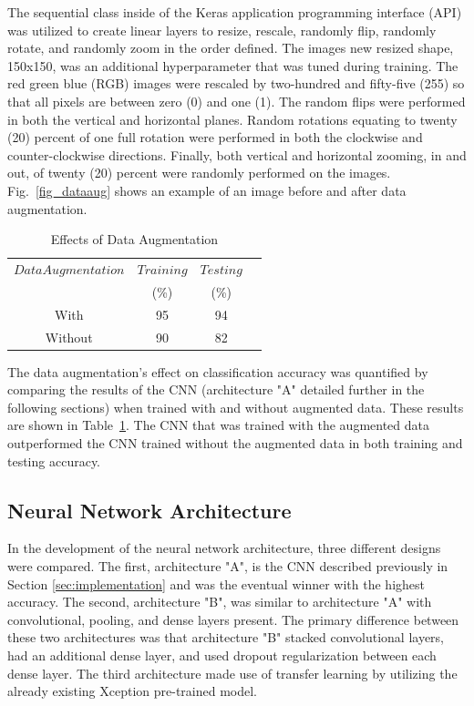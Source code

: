 \documentclass[conference]{IEEEtran}
\begin{document}
The sequential class inside of the Keras application programming interface (API) was utilized to create linear layers to resize, rescale, randomly flip, randomly rotate, and randomly zoom in the order defined. The images new resized shape, 150x150, was an additional hyperparameter that was tuned during training. The red green blue (RGB) images were rescaled by two-hundred and fifty-five (255) so that all pixels are between zero (0) and one (1). The random flips were performed in both the vertical and horizontal planes. Random rotations equating to twenty (20) percent of one full rotation were performed in both the clockwise and counter-clockwise directions. Finally, both vertical and horizontal zooming, in and out, of twenty (20) percent were randomly performed on the images. Fig.~\ref{fig_dataaug} shows an example of an image before and after data augmentation.

\begin{table}[htbp]
\caption{Effects of Data Augmentation}
\label{table_aug}\centering
\begin{tabular}{cccc}
\hline
$Data Augmentation$&$Training$&$Testing$\\
&(\%)&(\%)\\
\hline
With&95&94\\
Without&90&82\\
\hline
\end{tabular}
\end{table}

The data augmentation's effect on classification accuracy was quantified by comparing the results of the CNN (architecture "A" detailed further in the following sections) when trained with and without augmented data. These results are shown in Table~\ref{table_aug}. The CNN that was trained with the augmented data outperformed the CNN trained without the augmented data in both training and testing accuracy.

\subsection{Neural Network Architecture}\label{architecture}
In the development of the neural network architecture, three different designs were compared. The first, architecture "A", is the CNN described previously in Section \ref{sec:implementation} and was the eventual winner with the highest accuracy. The second, architecture "B", was similar to architecture "A" with convolutional, pooling, and dense layers present. The primary difference between these two architectures was that architecture "B" stacked convolutional layers, had an additional dense layer, and used dropout regularization between each dense layer. The third architecture made use of transfer learning by utilizing the already existing Xception pre-trained model.
\end{document}
